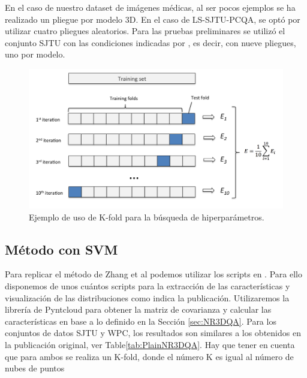 En el caso de nuestro dataset de imágenes médicas, al ser pocos ejemplos 
se ha realizado un pliegue por modelo 3D. En el caso de LS-SJTU-PCQA\cite{ResSCNN},
se optó por utilizar cuatro pliegues aleatorios. Para las pruebas preliminares
se utilizó el conjunto SJTU\cite{SJTU} con las condiciones indicadas por 
\cite{ResSCNN}, es decir, con nueve pliegues, uno por modelo. 

\begin{figure}[htp]
 \begin{center}
   \includegraphics[width=\textwidth]{imagenes/chapter5/cross-validation}
 \end{center}
 \caption{Ejemplo de uso de K-fold para la búsqueda de hiperparámetros.}
 \label{fig:K-fold}
\end{figure}

\subsection{Método con SVM}
Para replicar el método de Zhang et al\cite{NR3DQA} podemos utilizar los 
scripts en . Para ello disponemos de unos cuántos scripts para la extracción de las características y visualización de las distribuciones 
como indica la publicación. 
Utilizaremos la librería de Pyntcloud para obtener 
la matriz de covarianza y calcular las características en base a lo definido 
en la Sección \ref{sec:NR3DQA}.
Para los conjuntos de datos SJTU\cite{SJTU} y WPC\cite{WPC1,WPC2}, los resultados 
son similares a los obtenidos en la publicación original, ver Table\ref{tab:PlainNR3DQA}.
Hay que tener en cuenta que para ambos se realiza un K-fold, donde el número 
K es igual al número de nubes de puntos 

